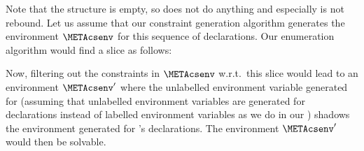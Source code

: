 \documentclass{jfp1}
\makeatletter
\newcommand{\sizeintables}{small}
\def\subsection{\@startsection{subsection}{2}{\z@}{-0.2\baselineskip plus -0.1\baselineskip minus -0.1\baselineskip}%
    {-0.5em \@plus -0.22em \@minus -0.1em}{\normalfont\normalsize\bfseries}}%
\newcommand{\sectiontitledot}[1]{#1.}
\renewcommand\subsection{\@startsection{subsection}{2}{\z@}%
                            {-6\p@ \@plus -1\p@ \@minus -1\p@}%
                            {-0.5em \@plus -0.22em \@minus -0.1em}%
                            {\normalfont\normalsize\bfseries\boldmath
                             \rightskip=\z@ \@plus 8em\pretolerance=10000\sectiontitledot}}
\makeatother
\begin{document}
Note that the structure  is empty, so
 does not do anything and especially
 is not rebound.
%
Let us assume that our constraint generation algorithm generates the
environment $\METAcsenv$ for this sequence of declarations.
%
Our enumeration algorithm would find a slice as follows:


Now, filtering out the constraints in $\METAcsenv$ w.r.t.\ this slice
would lead to an environment $\METAcsenv'$ where the unlabelled
environment variable generated for  (assuming
that unlabelled environment variables are generated for 
declarations instead of labelled environment variables as we do in our
\TES) shadows the environment generated for 's
declarations.  The environment $\METAcsenv'$ would then be solvable.




\end{document}
